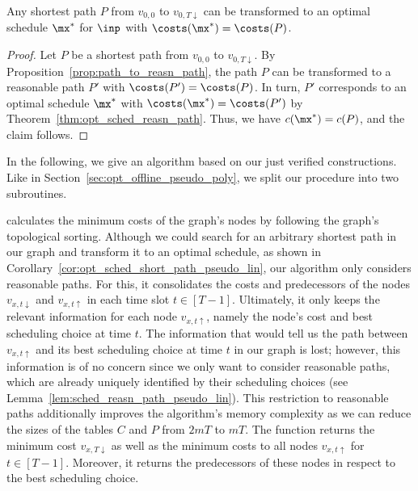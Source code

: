 \begin{cor}\label{cor:opt_sched_short_path_pseudo_lin}
Any shortest path $P$ from $v_{0,0}$ to $v_{0,T\downarrow}$ can be transformed to an optimal schedule $\mx^*$ for $\inp$ with $\costs(\mx^*)=\costs(P)$.
\end{cor}
\begin{proof}
Let $P$ be a shortest path from $v_{0,0}$ to $v_{0,T\downarrow}$. By Proposition~\ref{prop:path_to_reasn_path}, the path $P$ can be transformed to a reasonable path $P'$ with $\costs(P')=\costs(P)$.
In turn, $P'$ corresponds to an optimal schedule $\mx^*$ with $\costs(\mx^*)=\costs(P')$ by Theorem~\ref{thm:opt_sched_reasn_path}. Thus, we have $c(\mx^*)=c(P)$, and the claim follows.
\end{proof}
In the following, we give an algorithm based on our just verified constructions. Like in Section~\ref{sec:opt_offline_pseudo_poly}, we split our procedure into two subroutines.

 calculates the minimum costs of the graph's nodes by following the graph's topological sorting. Although we could search for an arbitrary shortest path in our graph and transform it to an optimal schedule, as shown in Corollary~\ref{cor:opt_sched_short_path_pseudo_lin}, our algorithm only considers reasonable paths. 
For this, it consolidates the costs and predecessors of the nodes $v_{x,t\downarrow}$ and $v_{x,t\uparrow}$ in each time slot $t\in[T-1]$. Ultimately, it only keeps the relevant information for each node $v_{x,t\uparrow}$, namely the node's cost and best scheduling choice at time $t$. The information that would tell us the path between $v_{x,t\uparrow}$ and its best scheduling choice at time $t$ in our graph is lost; however, this information is of no concern since we only want to consider reasonable paths, which are already uniquely identified by their scheduling choices (see Lemma~\ref{lem:sched_reasn_path_pseudo_lin}). This restriction to reasonable paths additionally improves the algorithm's memory complexity as we can reduce the sizes of the tables $C$ and $P$ from $2mT$ to $mT$. The function returns the minimum cost $v_{x,T\downarrow}$ as well as the minimum costs to all nodes $v_{x,t\uparrow}$ for $t\in[T-1]$. Moreover, it returns the predecessors of these nodes in respect to the best scheduling choice.

